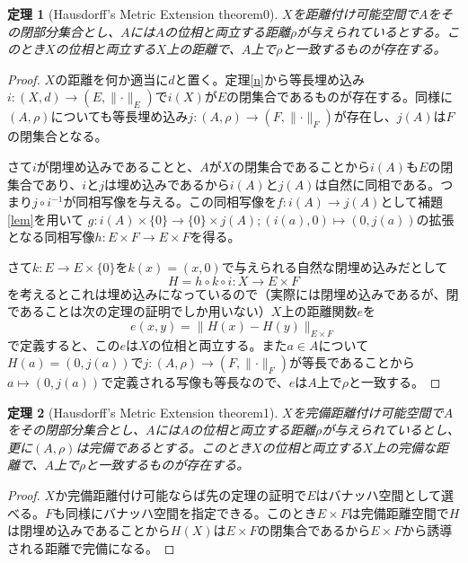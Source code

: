 \documentclass[leqno]{jsarticle}
\newtheorem{thm}{定理}
\begin{document}
\begin{thm}[Hausdorff's Metric Extension theorem0]\label{main}
$X$を距離付け可能空間で$A$をその閉部分集合とし、$A$には$A$の位相と両立する距離$\rho$が与えられているとする。このとき$X$の位相と両立する$X$上の距離で、$A$上で$\rho$と一致するものが存在する。
\end{thm}
\begin{proof}
$X$の距離を何か適当に$d$と置く。定理\ref{n}から等長埋め込み$i:(X,d)\to (E,\lVert\cdot\rVert_E)$で$i(X)$が$E$の閉集合であるものが存在する。同様に$(A,\rho)$についても等長埋め込み$j:(A,\rho)\to (F,\lVert\cdot\rVert_F)$が存在し、$j(A)$は$F$の閉集合となる。\par
さて$i$が閉埋め込みであることと、$A$が$X$の閉集合であることから$i(A)$も$E$の閉集合であり、$i$と$j$は埋め込みであるから$i(A)$と$j(A)$は自然に同相である。つまり$j\circ i^{-1}$が同相写像を与える。この同相写像を$f:i(A)\to j(A)$として補題\ref{lem}を用いて
$g:i(A)\times \{0\}\to \{0\}\times j(A); (i(a),0)\mapsto (0,j(a))$の拡張となる同相写像$h:E\times F\to E\times F$を得る。\par
さて$k:E\to E\times\{0\}$を$k(x)=(x,0)$で与えられる自然な閉埋め込みだとして
\[
H=h\circ k\circ i:X\to E\times F
\]
を考えるとこれは埋め込みになっているので（実際には閉埋め込みであるが、閉であることは次の定理の証明でしか用いない）$X$上の距離関数$e$を
\[
e(x,y)=\|H(x)-H(y)\|_{E\times F}
\]
で定義すると、この$e$は$X$の位相と両立する。また$a\in A$について$H(a)=(0,j(a))$で$j:(A,\rho)\to (F,\lVert\cdot\rVert_F)$が等長であることから$a\mapsto (0,j(a))$で定義される写像も等長なので、$e$は$A$上で$\rho$と一致する。
\end{proof}
\begin{thm}[Hausdorff's Metric Extension theorem1]
$X$を完備距離付け可能空間で$A$をその閉部分集合とし、$A$には$A$の位相と両立する距離$\rho$が与えられているとし、更に$(A,\rho)$は完備であるとする。このとき$X$の位相と両立する$X$上の完備な距離で、$A$上で$\rho$と一致するものが存在する。
\end{thm}
\begin{proof}
$X$か完備距離付け可能ならば先の定理の証明で$E$はバナッハ空間として選べる。$F$も同様にバナッハ空間を指定できる。このとき$E\times F$は完備距離空間で$H$は閉埋め込みであることから$H(X)$は$E\times F$の閉集合であるから$E\times F$から誘導される距離で完備になる。
\end{proof}
\end{document}
